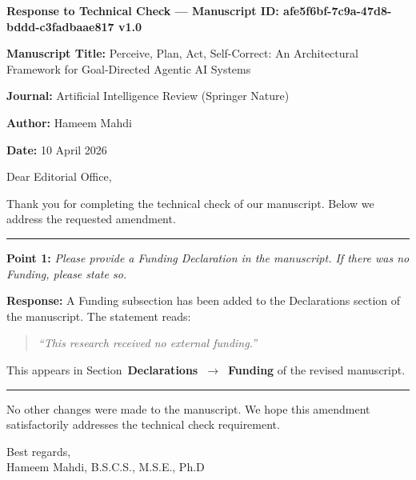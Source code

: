 \documentclass[11pt]{article}
\begin{document}
\noindent
\textbf{\large Response to Technical Check --- Manuscript ID: afe5f6bf-7c9a-47d8-bddd-c3fadbaae817 v1.0}

\medskip
\noindent
\textbf{Manuscript Title:} Perceive, Plan, Act, Self-Correct: An Architectural Framework for Goal-Directed Agentic AI Systems

\medskip
\noindent
\textbf{Journal:} Artificial Intelligence Review (Springer Nature)

\medskip
\noindent
\textbf{Author:} Hameem Mahdi

\medskip
\noindent
\textbf{Date:} 10 April 2026

\bigskip
\noindent
Dear Editorial Office,

\medskip
\noindent
Thank you for completing the technical check of our manuscript. Below we address the requested amendment.

\bigskip
\noindent
\rule{\textwidth}{0.4pt}

\medskip
\noindent
\textbf{Point 1:} \emph{Please provide a Funding Declaration in the manuscript. If there was no Funding, please state so.}

\medskip
\noindent
\textbf{Response:} A Funding subsection has been added to the Declarations section of the manuscript. The statement reads:

\medskip
\begin{quote}
\textit{``This research received no external funding.''}
\end{quote}

\noindent
This appears in Section~\textbf{Declarations~$\rightarrow$~Funding} of the revised manuscript.

\medskip
\noindent
\rule{\textwidth}{0.4pt}

\bigskip
\noindent
No other changes were made to the manuscript. We hope this amendment satisfactorily addresses the technical check requirement.

\bigskip
\noindent
Best regards,\\
Hameem Mahdi, B.S.C.S., M.S.E., Ph.D
\end{document}

